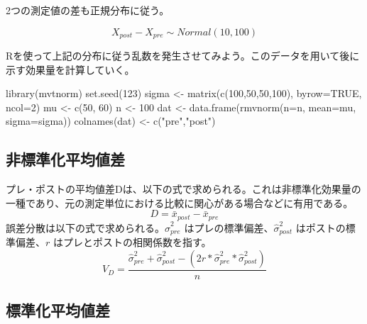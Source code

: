 \documentclass[
  ja=standard, xelatex, base=12pt]{bxjsreport}
\newenvironment{Shaded}{\begin{snugshade}}{\end{snugshade}}
\newcommand{\AttributeTok}[1]{\textcolor[rgb]{0.77,0.63,0.00}{#1}}
\newcommand{\ConstantTok}[1]{\textcolor[rgb]{0.00,0.00,0.00}{#1}}
\newcommand{\DecValTok}[1]{\textcolor[rgb]{0.00,0.00,0.81}{#1}}
\newcommand{\FunctionTok}[1]{\textcolor[rgb]{0.00,0.00,0.00}{#1}}
\newcommand{\NormalTok}[1]{#1}
\newcommand{\OtherTok}[1]{\textcolor[rgb]{0.56,0.35,0.01}{#1}}
\newcommand{\StringTok}[1]{\textcolor[rgb]{0.31,0.60,0.02}{#1}}
\begin{document}
2つの測定値の差も正規分布に従う。

\[
X_{post}-X_{pre}\sim Normal(10, 100)
\]

Rを使って上記の分布に従う乱数を発生させてみよう。このデータを用いて後に示す効果量を計算していく。

\begin{Shaded}
\begin{Highlighting}[]
\FunctionTok{library}\NormalTok{(mvtnorm)}
\FunctionTok{set.seed}\NormalTok{(}\DecValTok{123}\NormalTok{)}
\NormalTok{sigma }\OtherTok{\textless{}{-}} \FunctionTok{matrix}\NormalTok{(}\FunctionTok{c}\NormalTok{(}\DecValTok{100}\NormalTok{,}\DecValTok{50}\NormalTok{,}\DecValTok{50}\NormalTok{,}\DecValTok{100}\NormalTok{), }\AttributeTok{byrow=}\ConstantTok{TRUE}\NormalTok{, }\AttributeTok{ncol=}\DecValTok{2}\NormalTok{) }
\NormalTok{mu }\OtherTok{\textless{}{-}} \FunctionTok{c}\NormalTok{(}\DecValTok{50}\NormalTok{, }\DecValTok{60}\NormalTok{)}
\NormalTok{n }\OtherTok{\textless{}{-}} \DecValTok{100}
\NormalTok{dat }\OtherTok{\textless{}{-}} \FunctionTok{data.frame}\NormalTok{(}\FunctionTok{rmvnorm}\NormalTok{(}\AttributeTok{n=}\NormalTok{n, }\AttributeTok{mean=}\NormalTok{mu, }\AttributeTok{sigma=}\NormalTok{sigma)) }
\FunctionTok{colnames}\NormalTok{(dat) }\OtherTok{\textless{}{-}} \FunctionTok{c}\NormalTok{(}\StringTok{"pre"}\NormalTok{,}\StringTok{"post"}\NormalTok{)}
\end{Highlighting}
\end{Shaded}

\hypertarget{ux975eux6a19ux6e96ux5316ux5e73ux5747ux5024ux5dee-3}{%
\subsection{非標準化平均値差}\label{ux975eux6a19ux6e96ux5316ux5e73ux5747ux5024ux5dee-3}}

プレ・ポストの平均値差Dは、以下の式で求められる。これは非標準化効果量の一種であり、元の測定単位における比較に関心がある場合などに有用である。 \[
D=\bar{x}_{post}-\bar{x}_{pre}
\] 誤差分散は以下の式で求められる。\(\hat\sigma^2_{pre}\) はプレの標準偏差、\(\hat\sigma^2_{post}\) はポストの標準偏差、\(r\) はプレとポストの相関係数を指す。 \[
V_D=\frac{\hat\sigma^2_{pre}+\hat\sigma^2_{post}-(2r*\hat\sigma^2_{pre}*\hat\sigma^2_{post})}{n}
\]

\hypertarget{ux6a19ux6e96ux5316ux5e73ux5747ux5024ux5dee-3}{%
\subsection{標準化平均値差}\label{ux6a19ux6e96ux5316ux5e73ux5747ux5024ux5dee-3}}
\end{document}
